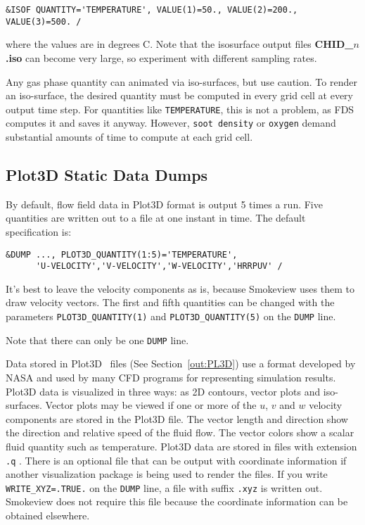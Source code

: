 \documentclass[11pt]{book}
\newcommand{\ct}{\tt\small}
\begin{document}
\footnotesize
\begin{verbatim}
&ISOF QUANTITY='TEMPERATURE', VALUE(1)=50., VALUE(2)=200., VALUE(3)=500. /
\end{verbatim}
\normalsize

\noindent
where the values are in degrees C. Note that the isosurface output
files {\bf CHID\_$n$.iso} can become very large, so experiment with different sampling rates.

Any gas phase quantity can animated via iso-surfaces, but use caution. To render an iso-surface, the desired quantity must be
computed in every grid cell at every output time step. For quantities like {\ct TEMPERATURE}, this is not a problem, as FDS computes it and saves it
anyway. However, {\ct soot density} or {\ct oxygen} demand substantial amounts of time to compute at each grid cell.




\subsection{Plot3D Static Data Dumps}
\label{info:PL3D}

By default, flow field data in Plot3D format is output 5 times a run.
Five quantities are written out to a file at one instant in time. The default specification is:

\footnotesize
\begin{verbatim}
&DUMP ..., PLOT3D_QUANTITY(1:5)='TEMPERATURE',
      'U-VELOCITY','V-VELOCITY','W-VELOCITY','HRRPUV' /
\end{verbatim}
\normalsize

\noindent
It's best to leave the velocity components as is, because Smokeview
uses them to draw velocity vectors. The first and fifth quantities can
be changed with the parameters {\ct PLOT3D\_QUANTITY(1)} and {\ct PLOT3D\_QUANTITY(5)}
on the {\ct DUMP} line.

\begin{warning}
Note that there can only be one {\ct DUMP} line.
\end{warning}

Data stored in Plot3D~\cite{PLOT3D} files (See Section~\ref{out:PL3D}) use a format developed by
NASA and used by many CFD programs for representing simulation results.
Plot3D data is visualized in three ways: as 2D contours, vector plots and iso-surfaces.
Vector plots may be viewed if one or more of the $u$, $v$ and $w$
velocity components are stored in the Plot3D file. The vector
length and direction show the direction and relative speed of the
fluid flow. The vector colors show a scalar fluid quantity such as
temperature.
Plot3D data are stored in files with extension {\ct .q} . There is
an optional file that can be output with coordinate information
if another visualization package is being used to render the
files. If you write {\ct WRITE\_XYZ=.TRUE.} on the {\ct DUMP}
line, a file with suffix {\ct .xyz} is written out. Smokeview
does not require this file because the coordinate information can be
obtained elsewhere.
\end{document}

